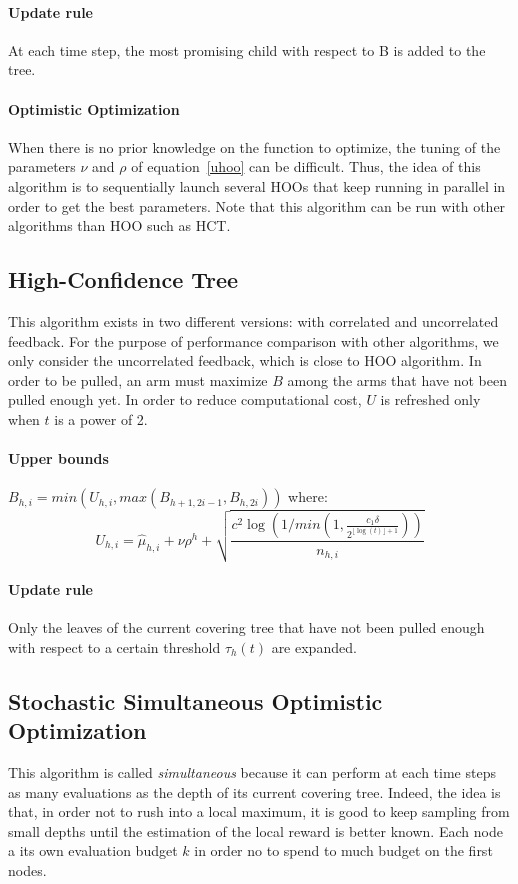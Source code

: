 \documentclass[a4paper,10pt]{article}
\begin{document}
\paragraph{Update rule} At each time step, the most promising child with respect to B is added to the tree.

\paragraph{Optimistic Optimization}
When there is no prior knowledge on the function to optimize, the tuning of the parameters $\nu$ and $\rho$ of equation~\ref{uhoo} can be difficult. Thus, the idea of this algorithm is to sequentially launch several HOOs that keep running in parallel in order to get the best parameters. Note that this algorithm can be run with other algorithms than HOO such as HCT.

\subsection{High-Confidence Tree}
This algorithm exists in two different versions: with correlated and uncorrelated feedback. For the purpose of performance comparison with other algorithms, we only consider the uncorrelated feedback, which is close to HOO algorithm. In order to be pulled, an arm must maximize $B$ among the arms that have not been pulled enough yet. In order to reduce computational cost, $U$ is refreshed only when $t$ is a power of 2.
\paragraph{Upper bounds} $B_{h,i}=min(U_{h,i},max(B_{h+1,2i-1},B_{h,2i}))$ where:
\begin{equation}
\label{uhct}
U_{h,i}=\widehat{\mu}_{h,i}+\nu \rho^h+\sqrt{\dfrac{c^2\log(1/min(1,\frac{c_1\delta}{2^{\lfloor \log(t) \rfloor + 1}}))}{n_{h,i}}}
\end{equation}
\paragraph{Update rule} Only the leaves of the current covering tree that have not been pulled enough with respect to a certain threshold $\tau_h(t)$ are expanded.

\subsection{Stochastic Simultaneous Optimistic Optimization}
This algorithm is called \textit{simultaneous} because it can perform at each time steps as many evaluations as the depth of its current covering tree. Indeed, the idea is that, in order not to rush into a local maximum, it is good to keep sampling from small depths until the estimation of the local reward is better known. Each node a its own evaluation budget $k$ in order no to spend to much budget on the first nodes.
\end{document}
